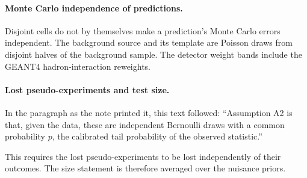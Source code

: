 \paragraph{Monte Carlo independence of predictions.} Disjoint cells do not by themselves make a prediction's Monte Carlo errors independent. The background source and its template are Poisson draws from disjoint halves of the background sample. The detector weight bands include the GEANT4 hadron-interaction reweights.

\paragraph{Lost pseudo-experiments and test size.} In the paragraph as the note printed it, this text followed: ``Assumption A2 is that, given the data, these are independent Bernoulli draws with a common probability $p$, the calibrated tail probability of the observed statistic.''\par This requires the lost pseudo-experiments to be lost independently of their outcomes. The size statement is therefore averaged over the nuisance priors.

